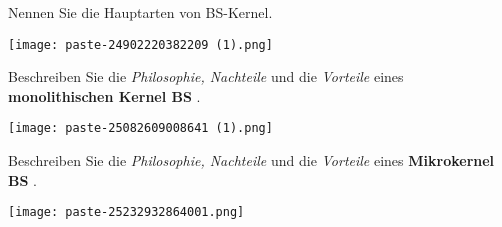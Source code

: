 \documentclass{article}
\begin{document}
\begin{tcolorbox}[colback=white!10!white,colframe=lightgray!75!black,
  savelowerto=\jobname_ex.tex,breakable,enhanced,lines before break=40]

\begin{center}
Nennen Sie die Hauptarten von BS-Kernel.

\end{center}

\tcblower

\justifying
\begin{center}
\texttt{[image: paste-24902220382209 (1).png]}
\end{center}

\end{tcolorbox}
\begin{tcolorbox}[colback=white!10!white,colframe=lightgray!75!black,
  savelowerto=\jobname_ex.tex,breakable,enhanced,lines before break=40]

\begin{center}
Beschreiben Sie die 
\textit{Philosophie, Nachteile
}und die 
\textit{Vorteile
}eines 
\textbf{monolithischen Kernel BS
}.

\end{center}

\tcblower

\justifying
\begin{center}
\texttt{[image: paste-25082609008641 (1).png]}
\end{center}

\end{tcolorbox}
\begin{tcolorbox}[colback=white!10!white,colframe=lightgray!75!black,
  savelowerto=\jobname_ex.tex,breakable,enhanced,lines before break=40]

\begin{center}
Beschreiben Sie die
\textit{Philosophie, Nachteile
}und die
\textit{Vorteile
}eines
\textbf{Mikrokernel BS
}.

\end{center}

\tcblower

\justifying
\begin{center}
\texttt{[image: paste-25232932864001.png]}
\end{center}

\end{tcolorbox}
\end{document}
